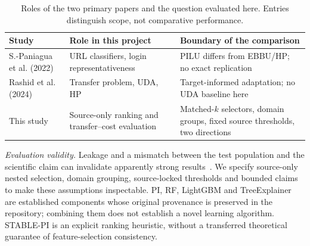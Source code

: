 \begin{table}[t]
\caption{Roles of the two primary papers and the question evaluated here. Entries distinguish scope, not comparative performance.}
\label{tab:positioning}
\centering\scriptsize
\setlength{\tabcolsep}{3pt}
\begin{tabular}{>{\raggedright\arraybackslash}p{}>{\raggedright\arraybackslash}p{}>{\raggedright\arraybackslash}p{}}
\toprule
Study & Role in this project & Boundary of the comparison \\
\midrule
S.-Paniagua et al. (2022) & URL classifiers, login representativeness & PILU differs from EBBU/HP; no exact replication \\
Rashid et al. (2024) & Transfer problem, UDA, HP & Target-informed adaptation; no UDA baseline here \\
This study & Source-only ranking and transfer--cost evaluation & Matched-$k$ selectors, domain groups, fixed source thresholds, two directions \\
\bottomrule
\end{tabular}
\end{table}

\textit{Evaluation validity.} Leakage and a mismatch between the test population and the scientific claim can invalidate apparently strong results~\cite{kapoor2023}. We specify source-only nested selection, domain grouping, source-locked thresholds and bounded claims to make these assumptions inspectable. PI, RF, LightGBM and TreeExplainer are established components whose original provenance is preserved in the repository; combining them does not establish a novel learning algorithm. STABLE-PI is an explicit ranking heuristic, without a transferred theoretical guarantee of feature-selection consistency.
